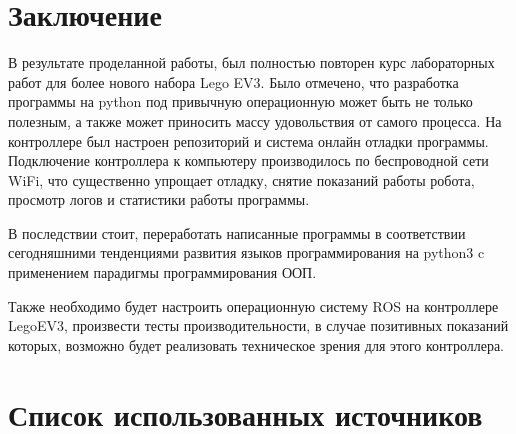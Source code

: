 \documentclass[a4paper,14pt]{extreport}
\begin{document}
	\newpage
	\section*{Заключение}
	
	В результате проделанной работы, был полностью повторен курс лабораторных работ для более нового набора Lego EV3. Было отмечено, что разработка программы на python под привычную операционную может быть не только полезным, а также может приносить массу удовольствия от самого процесса. На контроллере был настроен репозиторий и система онлайн отладки программы. Подключение контроллера к компьютеру производилось по беспроводной сети WiFi, что существенно упрощает отладку, снятие показаний работы робота, просмотр логов и статистики работы программы.
	
	В последствии стоит, переработать написанные программы в соответствии сегодняшними тенденциями развития языков программирования на python3 c применением парадигмы программирования ООП.
	
	Также необходимо будет настроить операционную систему ROS на контроллере LegoEV3, произвести тесты производительности, в случае позитивных показаний которых, возможно будет реализовать техническое зрения для этого контроллера.
	
	\newpage
	\section*{Список использованных источников}
	
\end{document}
